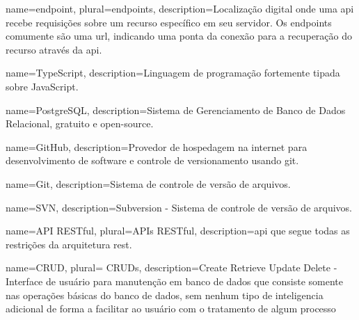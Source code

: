 {
	name=endpoint,
	plural=endpoints,
	description={Localização digital onde uma \ac{api} recebe requisições sobre um recurso específico em seu servidor. Os endpoints comumente são uma \ac{url}, indicando uma ponta da conexão para a recuperação do recurso através da \ac{api}.}
}

 {
	name=TypeScript,
	description={Linguagem de programação fortemente tipada sobre JavaScript.}
}

 {
	name=PostgreSQL,
	description={Sistema de Gerenciamento de Banco de Dados Relacional, gratuito e open-source.}
}

 {
	name=GitHub,
	description={Provedor de hospedagem na internet para desenvolvimento de software e controle de versionamento usando \gls{git}.}
}

 {
	name=Git,
	description={Sistema de controle de versão de arquivos.}
}

 {
	name=SVN,
	description={Subversion - Sistema de controle de versão de arquivos.}
}

 {
	name=API RESTful,
	plural=APIs RESTful,
	description={\ac{api} que segue todas as restrições da arquitetura \ac{rest}.}
}


 



 {
    name=CRUD,
    plural= {CRUDs},
    description={Create Retrieve Update Delete - Interface de usuário para manutenção em banco de dados que consiste somente nas operações básicas do banco de dados, sem nenhum tipo de inteligencia adicional de forma a facilitar ao usuário com o tratamento de algum processo}
}

